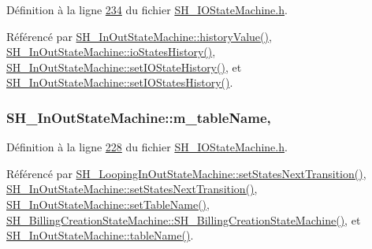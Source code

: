 Définition à la ligne \hyperlink{SH__IOStateMachine_8h_source_l00234}{234} du fichier \hyperlink{SH__IOStateMachine_8h_source}{S\-H\-\_\-\-I\-O\-State\-Machine.\-h}.



Référencé par \hyperlink{classSH__InOutStateMachine_af71bfdb3b59b7bf2763588b513b4205f}{S\-H\-\_\-\-In\-Out\-State\-Machine\-::history\-Value()}, \hyperlink{classSH__InOutStateMachine_a13889998c6dcd17db984dd6ed1454e80}{S\-H\-\_\-\-In\-Out\-State\-Machine\-::io\-States\-History()}, \hyperlink{classSH__InOutStateMachine_acbcce2c4300af1634d928b30e5e9be1c}{S\-H\-\_\-\-In\-Out\-State\-Machine\-::set\-I\-O\-State\-History()}, et \hyperlink{classSH__InOutStateMachine_af51f92c37d00a4eec4da42113cfd7d73}{S\-H\-\_\-\-In\-Out\-State\-Machine\-::set\-I\-O\-States\-History()}.

\hypertarget{classSH__InOutStateMachine_aa009eecc5ab6181358faafb5996b6006}{
\subsubsection[{m\-\_\-table\-Name}]{\setlength{\rightskip}{0pt plus 5cm}S\-H\-\_\-\-In\-Out\-State\-Machine\-::m\-\_\-table\-Name\hspace{0.3cm}{\ttfamily [protected]}, {\ttfamily [inherited]}}}\label{classSH__InOutStateMachine_aa009eecc5ab6181358faafb5996b6006}


Définition à la ligne \hyperlink{SH__IOStateMachine_8h_source_l00228}{228} du fichier \hyperlink{SH__IOStateMachine_8h_source}{S\-H\-\_\-\-I\-O\-State\-Machine.\-h}.



Référencé par \hyperlink{classSH__LoopingInOutStateMachine_a0ee122553641721012f3710e71cce234}{S\-H\-\_\-\-Looping\-In\-Out\-State\-Machine\-::set\-States\-Next\-Transition()}, \hyperlink{classSH__InOutStateMachine_a70d6d81c0a8d4afd6aab0a7239edc237}{S\-H\-\_\-\-In\-Out\-State\-Machine\-::set\-States\-Next\-Transition()}, \hyperlink{classSH__InOutStateMachine_a95db31a7e7f31f36a8737adc739ab08c}{S\-H\-\_\-\-In\-Out\-State\-Machine\-::set\-Table\-Name()}, \hyperlink{classSH__BillingCreationStateMachine_ad62b77fa4aeafe200056ff3974562f83}{S\-H\-\_\-\-Billing\-Creation\-State\-Machine\-::\-S\-H\-\_\-\-Billing\-Creation\-State\-Machine()}, et \hyperlink{classSH__InOutStateMachine_a4288a6c86ddf83effefff886675591c9}{S\-H\-\_\-\-In\-Out\-State\-Machine\-::table\-Name()}.



